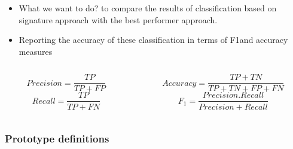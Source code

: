 \documentclass{beamer}
\begin{document}
\begin{frame}
\begin{overprint}
\begin{itemize}
	\item What we want to do? to compare the results of classification based on signature approach with the best performer \small approach.
	\item Reporting the accuracy of these classification in terms of F1and accuracy measures
\end{itemize}
\begin{columns}
\begin{column}{.4\textwidth}
\vspace{-0.5cm}
\begin{center}

\[Precision = \frac{TP}{TP+FP}\]
\[Recall = \frac{TP}{TP+FN}\]

\end{center}
\end{column}
\begin{column}{.6\textwidth}
\vspace{-1cm}
\begin{center}
\[Accuracy = \frac{TP+TN}{TP+TN+FP+FN}\]
\[F_1 = \frac{Precision.Recall}{Precision+Recall}\]
\end{center}
\end{column}
\end{columns}
\end{overprint}


\end{frame}

\begin{frame}\frametitle{Prototype definitions}

\end{frame}
\end{document}
